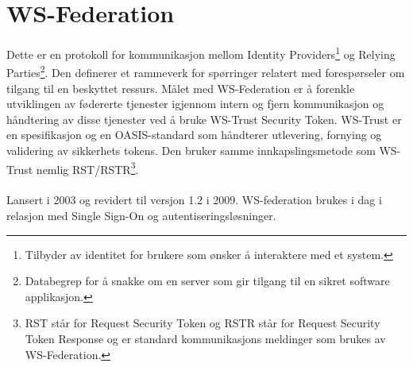 \section{WS-Federation}
\label{sec:teoridel_WSFederation}
Dette er en protokoll for kommunikasjon mellom Identity Providers\footnote{Tilbyder av identitet for brukere som ønsker å interaktere med et system.} og Relying Parties\footnote{Databegrep for å snakke om en server som gir tilgang til en sikret software applikasjon.}. Den definerer et rammeverk for spørringer relatert med forespørseler om tilgang til en beskyttet ressurs. Målet med WS-Federation er å forenkle utviklingen av fødererte tjenester igjennom intern og fjern kommunikasjon og håndtering av disse tjenester ved å bruke WS-Trust Security Token. WS-Trust er en spesifikasjon og en OASIS-standard som håndterer utlevering, fornying og validering av sikkerhets tokens. Den bruker samme innkapslingsmetode som WS-Trust nemlig RST/RSTR\footnote{RST står for Request Security Token og RSTR står for Request Security Token Response og er standard kommunikasjons meldinger som brukes av WS-Federation.}. \\
\\
Lansert i 2003 og revidert til versjon 1.2 i 2009. WS-federation brukes i dag i relasjon med Single Sign-On og autentiseringsløsninger.

